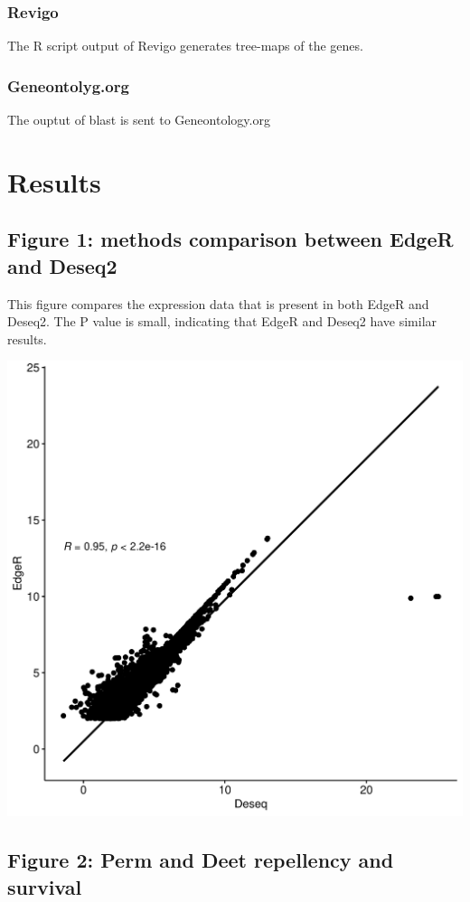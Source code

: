 \documentclass[11pt]{article}
\begin{document}
\subsubsection{Revigo}
\label{sec:org4ff4065}
The R script output of Revigo generates tree-maps of the genes.
\subsubsection{Geneontolyg.org}
\label{sec:org6f660e8}
The ouptut of blast is sent to Geneontology.org
\section{Results}
\label{sec:orgb19913f}
\subsection{Figure 1: methods comparison between EdgeR and Deseq2}
\label{sec:orgb667e92}
This figure compares the expression data that is present in both EdgeR and Deseq2. The P value is small, indicating that EdgeR and Deseq2 have similar results.
\begin{center}
\includegraphics[width=.9\linewidth]{figure1/pearson.png}
\end{center}
\subsection{Figure 2: Perm and Deet repellency and survival}
\label{sec:org526f677}
\end{document}
